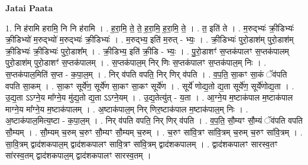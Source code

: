 \documentclass[17pt]{extarticle}
\begin{document}
\textbf{Jatai Paata} \newline

1. नि ह॑रामि हरामि॒ नि नि ह॑रामि । . ह॒रा॒मि॒ ते॒ ते॒ ह॒रा॒मि॒ ह॒रा॒मि॒ ते॒ । . त॒ इति॑ ते । . म॒रुद्भ्यः॑ क्री॒डिभ्यः॑ क्री॒डिभ्यो॑ म॒रुद्भ्यो॑ म॒रुद्भ्यः॑ क्री॒डिभ्यः॑ । . म॒रुद्भ्य॒ इति॑ म॒रुत् - भ्यः॒ । . क्री॒डिभ्यः॑ पुरो॒डाश॑म् पुरो॒डाश॑म् क्री॒डिभ्यः॑ क्री॒डिभ्यः॑ पुरो॒डाश᳚म् । . क्री॒डिभ्य॒ इति॑ क्री॒डि - भ्यः॒ । . पु॒रो॒डाशꣳ॑ स॒प्तक॑पालꣳ स॒प्तक॑पालम् पुरो॒डाश॑म् पुरो॒डाशꣳ॑ स॒प्तक॑पालम् । . स॒प्तक॑पाल॒म् निर् णिः स॒प्तक॑पालꣳ स॒प्तक॑पाल॒म् निः । . स॒प्तक॑पाल॒मिति॑ स॒प्त - क॒पा॒ल॒म् । . निर् व॑पति वपति॒ निर् णिर् व॑पति । . व॒प॒ति॒ सा॒कꣳ सा॒कं ॅव॑पति वपति सा॒कम् । . सा॒कꣳ सूर्ये॑ण॒ सूर्ये॑ण सा॒कꣳ सा॒कꣳ सूर्ये॑ण । . सूर्ये॑ णोद्य॒तो द्य॒ता सूर्ये॑ण॒ सूर्ये॑णोद्य॒ता । . उ॒द्य॒ता ऽऽग्ने॒य मा᳚ग्ने॒य मु॑द्य॒तो द्य॒ता ऽऽग्ने॒यम् । . उ॒द्य॒तेत्यु॑त् - य॒ता । . आ॒ग्ने॒य म॒ष्टाक॑पाल म॒ष्टाक॑पाल माग्ने॒य मा᳚ग्ने॒य म॒ष्टाक॑पालम् । . अ॒ष्टाक॑पाल॒म् निर् णिर॒ष्टाक॑पाल म॒ष्टाक॑पाल॒म् निः । . अ॒ष्टाक॑पाल॒मित्य॒ष्टा - क॒पा॒ल॒म् । . निर् व॑पति वपति॒ निर् णिर् व॑पति । . व॒प॒ति॒ सौ॒म्यꣳ सौ॒म्यं ॅव॑पति वपति सौ॒म्यम् । . सौ॒म्यम् च॒रुम् च॒रुꣳ सौ॒म्यꣳ सौ॒म्यम् च॒रुम् । . च॒रुꣳ सा॑वि॒त्रꣳ सा॑वि॒त्रम् च॒रुम् च॒रुꣳ सा॑वि॒त्रम् । . सा॒वि॒त्रम् द्वाद॑शकपाल॒म् द्वाद॑शकपालꣳ सावि॒त्रꣳ सा॑वि॒त्रम् द्वाद॑शकपालम् । . द्वाद॑शकपालꣳ सारस्व॒तꣳ सा॑रस्व॒तम् द्वाद॑शकपाल॒म् द्वाद॑शकपालꣳ सारस्व॒तम् । \newline
\end{document}
